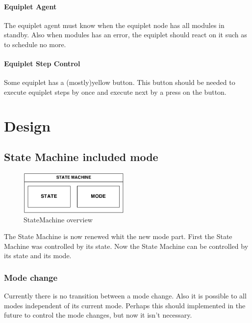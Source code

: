 \documentclass[12pt,a4paper]{report}
\begin{document}
\subsubsection{Equiplet Agent}
The equiplet agent must know when the equiplet node has all modules in standby. Also when modules has an error, the equiplet should react on it such as to schedule no more.
\subsubsection{Equiplet Step Control}
Some equiplet has a (mostly)yellow button. This button should be needed to execute equiplet steps by once and execute next by a press on the button.

\chapter{Design}
\section{State Machine included mode}
\begin{figure}
  \vspace{-30pt}
  \begin{center}
    \includegraphics[width=0.48\textwidth]{pictures/StateMachine_mode.png}
  \end{center}
  \vspace{-20pt}
  \caption{StateMachine overview}
  \vspace{-10pt}
\end{figure}
The State Machine is now renewed whit the new mode part. First the State Machine was controlled by its state. Now the State Machine can be controlled by its state and its mode.

\subsection{Mode change}
Currently there is no transition between a mode change. Also it is possible to all modes independent of its current mode. Perhaps this should implemented in the future to control the mode changes, but now it isn't necessary.
\end{document}
